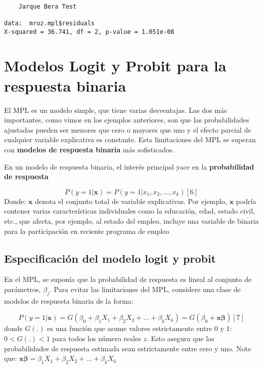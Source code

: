 \documentclass[
  letterpaper,
  DIV=11,
  numbers=noendperiod]{scrreprt}
\begin{document}
\begin{verbatim}

    Jarque Bera Test

data:  mroz.mpl$residuals
X-squared = 36.741, df = 2, p-value = 1.051e-08
\end{verbatim}

\section{Modelos Logit y Probit para la respuesta
binaria}\label{modelos-logit-y-probit-para-la-respuesta-binaria}

El MPL es un modelo simple, que tiene varias desventajas. Las dos más
importantes, como vimos en los ejemplos anteriores, son que las
probabilidades ajustadas pueden ser menores que cero o mayores que uno y
el efecto parcial de cualquier variable explicativa es constante. Esta
limitaciones del MPL se superan con \textbf{modelos de respuesta
binaria} más sofisticados.

En un modelo de respuesta binaria, el interés principal yace en la
\textbf{probabilidad de respuesta}

\[P(y=1|\mathbf{x})=P(y=1|x_1,x_2,...,x_k)[6]\] Donde: \(\mathbf{x}\)
denota el conjunto total de variable explicativas. Por ejemplo,
\(\mathbf{x}\) podría contener varias características individuales como
la educación, edad, estado civil, etc., que afecta, por ejemplo, al
estado del empleo, incluye una variable de binaria para la participación
en reciente programa de empleo

\subsection{Especificación del modelo logit y
probit}\label{especificaciuxf3n-del-modelo-logit-y-probit}

En el MPL, se suponía que la probabilidad de respuesta es lineal al
conjunto de parámetros, \(\beta_j\). Para evitar las limitaciones del
MPL, considere una clase de modelos de respuesta binaria de la forma:

\[P(y=1|\mathbf{x})=G(\beta_0+\beta_1X_1+\beta_2X_2+...+\beta_kX_k)=G(\beta_0+\mathbf{x\beta})[7]\]
donde \(G(.)\) es una función que asume valores estrictamente entre 0 y
1: \(0<G(.)<1\) para todos los número reales \(z\). Esto asegura que las
probabilidades de respuesta estimada sean estrictamente entre cero y
uno. Note que: \(\mathbf{x\beta}=\beta_1X_1+\beta_2X_2+...+\beta_kX_k\)
\end{document}
